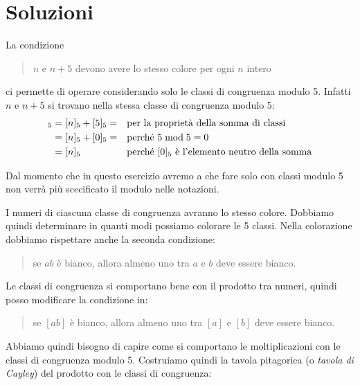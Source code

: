 \chapter{Soluzioni}
\label{ch:soluzioni}

\begin{soluzione}
    La condizione
    \begin{quotation}
        $n$ e $n + 5$ devono avere lo stesso colore per ogni $n$ intero
    \end{quotation}
    ci permette di operare considerando solo le classi di congruenza modulo 5.
    Infatti $n$ e $n + 5$ si trovano nella stessa classe di congruenza modulo 5:
    \begin{align*}
        [n + 5]_5 &= [n]_5 + [5]_5 = && \text{per la proprietà della somma di classi} \\
        &= [n]_5 + [0]_5 = && \text{perché $5 \modulo 5 = 0$} \\
        &= [n]_5 && \text{perché $[0]_5$ è l'elemento neutro della somma}
    \end{align*}

    Dal momento che in questo esercizio avremo a che fare solo con classi modulo 5 non verrà più scecificato il modulo
    nelle notazioni.

    I numeri di ciascuna classe di congruenza avranno lo stesso colore.
    Dobbiamo quindi determinare in quanti modi possiamo colorare le 5 classi.
    Nella colorazione dobbiamo rispettare anche la seconda condizione:
    \begin{quotation}
        se $ab$ è bianco, allora almeno uno tra $a$ e $b$ deve essere bianco.
    \end{quotation}

    Le classi di congruenza si comportano bene con il prodotto tra numeri, quindi posso modificare la condizione in:
    \begin{quotation}
        se $[ab]$ è bianco, allora almeno uno tra $[a]$ e $[b]$ deve essere bianco.
    \end{quotation}

    Abbiamo quindi bisogno di capire come si comportano le moltiplicazioni con le classi di congruenza modulo 5.
    Costruiamo quindi la tavola pitagorica (o \emph{tavola di Cayley}) del prodotto con le classi di congruenza:


\end{soluzione}
